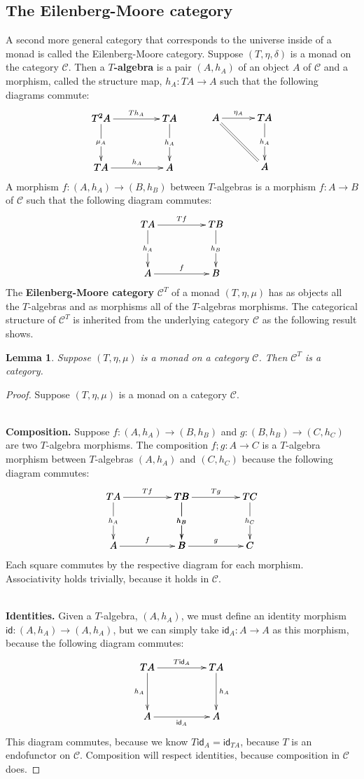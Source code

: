 \documentclass{article}
\let\mto\to
\let\to\relax
\newcommand{\to}{\rightarrow}
\newcommand{\cat}[1]{\mathcal{#1}}
\newcommand{\id}[0]{\mathsf{id}}
\newtheorem{lemma}[theorem]{Lemma}
\begin{document}
\subsection{The Eilenberg-Moore category}
\label{subsec:the_eilenberg-moore_category}
A second more general category that corresponds to the universe inside
of a monad is called the Eilenberg-Moore category.  Suppose $(T,
\eta,\delta)$ is a monad on the category $\cat{C}$.  Then a
\textbf{$T$-algebra} is a pair $(A,h_A)$ of an object $A$ of $\cat{C}$
and a morphism, called the structure map, $h_A : TA \mto A$ such that
the following diagrams commute:
\[
\begin{array}{lll}
  \bfig
\square|amma|<700,500>[
  T^2A`
  TA`
  TA`
  A;
  Th_A`
  \mu_A`
  h_A`
  h_A]
\efig
& \quad &
\bfig
\qtriangle|amm|/->`=`->/[
  A`
  TA`
  A;
  \eta_A``
  h_A]
\efig
\end{array}
\]
A morphism $f : (A,h_A) \mto (B,h_B)$ between $T$-algebras is a
morphism $f : A \mto B$ of $\cat{C}$ such that the following diagram
commutes:
\[
\bfig
\square|amma|<700,500>[
  TA`
  TB`
  A`
  B;
  Tf`
  h_A`
  h_B`
  f]
\efig
\]
The \textbf{Eilenberg-Moore category} $\cat{C}^T$ of a monad
$(T,\eta,\mu)$ has as objects all the $T$-algebras and as morphisms
all of the $T$-algebras morphisms.  The categorical structure of
$\cat{C}^T$ is inherited from the underlying category $\cat{C}$ as the
following result shows.
\begin{lemma}
  \label{lemma:EMC-is-cat}
  Suppose $(T,\eta,\mu)$ is a monad on a category $\cat{C}$.  Then
  $\cat{C}^T$ is a category.
\end{lemma}
\begin{proof}
  Suppose $(T,\eta,\mu)$ is a monad on a category $\cat{C}$.

  \ \\
  \noindent
  \textbf{Composition.}  Suppose $f : (A,h_A) \mto (B,h_B)$ and $g :
  (B,h_B) \mto (C,h_C)$ are two $T$-algebra morphisms.  The
  composition $f;g : A \mto C$ is a $T$-algebra morphism between
  $T$-algebras $(A,h_A)$ and $(C,h_C)$ because the following diagram
  commutes:
  \[
  \bfig
  \square|amma|<700,500>[
    TA`
    TB`
    A`
    B;
    Tf`
    h_A`
    h_B`
    f]
    \square(700,0)|amma|<700,500>[
    TB`
    TC`
    B`
    C;
    Tg`
    h_B`
    h_C`
    g]
  \efig
  \]
  Each square commutes by the respective diagram for each morphism.
  Associativity holds trivially, because it holds in $\cat{C}$.

  \ \\
  \noindent
  \textbf{Identities.} Given a $T$-algebra, $(A,h_A)$, we must define
  an identity morphism $\id : (A,h_A) \mto (A,h_A)$, but we can simply
  take $\id_A : A \mto A$ as this morphism, because the following
  diagram commutes:
  \[
  \bfig
  \square<700,500>[
    TA`
    TA`
    A`
    A;
    T\id_A`
    h_A`
    h_A`
    \id_A]
  \efig
  \]
  This diagram commutes, because we know $T\id_A = \id_{TA}$, because
  $T$ is an endofunctor on $\cat{C}$.  Composition will respect
  identities, because composition in $\cat{C}$ does.
\end{proof}
\end{document}
